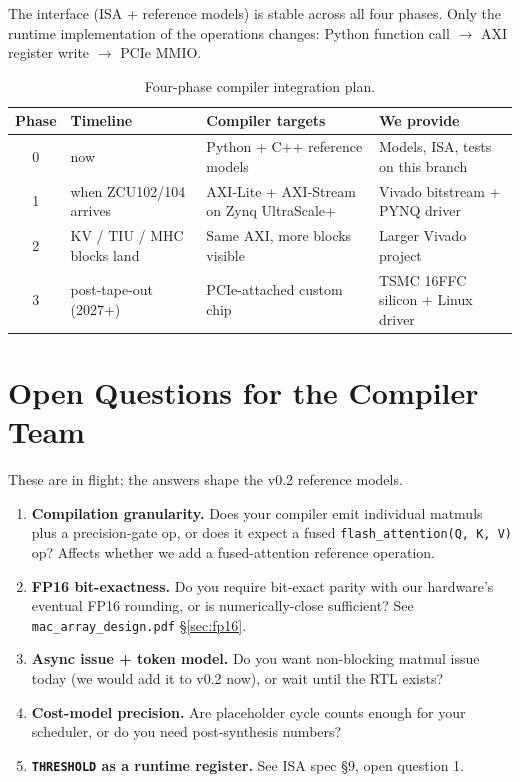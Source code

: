 \documentclass[11pt]{article}
\begin{document}
The interface (ISA + reference models) is stable across all four
phases. Only the runtime implementation of the operations changes:
Python function call $\rightarrow$ AXI register write
$\rightarrow$ PCIe MMIO.

\begin{table}[ht]
\centering
\small
\renewcommand{\arraystretch}{1.2}
\caption{Four-phase compiler integration plan.}
\label{tab:phases}
\begin{tabular}{@{}c p{3.0cm} p{4.0cm} p{5.0cm}@{}}
\toprule
Phase & Timeline & Compiler targets & We provide \\
\midrule
0 & now                      & Python + C++ reference models                & Models, ISA, tests on this branch \\
1 & when ZCU102/104 arrives  & AXI-Lite + AXI-Stream on Zynq UltraScale+    & Vivado bitstream + PYNQ driver \\
2 & KV / TIU / MHC blocks land & Same AXI, more blocks visible              & Larger Vivado project \\
3 & post-tape-out (2027+)    & PCIe-attached custom chip                    & TSMC 16FFC silicon + Linux driver \\
\bottomrule
\end{tabular}
\end{table}

\section{Open Questions for the Compiler Team}
\label{sec:open}

These are in flight; the answers shape the v0.2 reference models.

\begin{enumerate}
\item \textbf{Compilation granularity.} Does your compiler emit
      individual matmuls plus a precision-gate op, or does it expect
      a fused \texttt{flash\_attention(Q, K, V)} op? Affects whether
      we add a fused-attention reference operation.
\item \textbf{FP16 bit-exactness.} Do you require bit-exact parity
      with our hardware's eventual FP16 rounding, or is
      numerically-close sufficient? See
      \texttt{mac\_array\_design.pdf} \S\ref{sec:fp16}.
\item \textbf{Async issue + token model.} Do you want non-blocking
      matmul issue today (we would add it to v0.2 now), or wait
      until the RTL exists?
\item \textbf{Cost-model precision.} Are placeholder cycle counts
      enough for your scheduler, or do you need post-synthesis
      numbers?
\item \textbf{\texttt{THRESHOLD} as a runtime register.} See ISA spec
      \S9, open question 1.
\end{enumerate}
\end{document}
